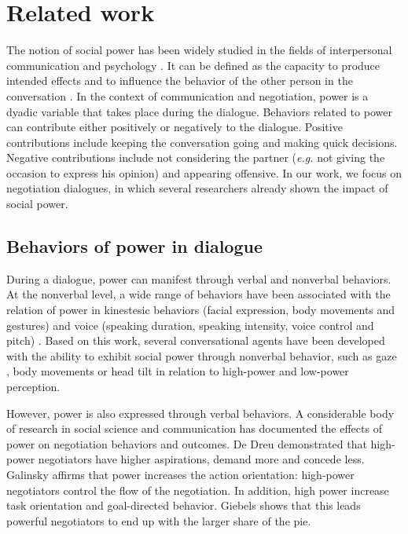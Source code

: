 \documentclass{llncs}
\begin{document}
		\section{Related work}
		The notion of social power has been widely studied in the fields of interpersonal communication and psychology \cite{kecskes2013research}. It can be defined as the capacity to produce intended effects and to influence the behavior of the other person in the conversation \cite{dunbar2005perceptions}. In the context of communication and negotiation, power is a dyadic variable that takes place during the dialogue.
		Behaviors related to power can contribute either positively or negatively to the dialogue. Positive contributions include keeping the conversation going and making quick decisions. Negative contributions include not considering the partner (\emph{e.g.} not giving the occasion to express his opinion) and appearing offensive. In our work, we focus on negotiation dialogues, in which several researchers already shown the impact of social power\cite{de2004influence,burgoonnonverbal}.

		\subsection{Behaviors of power in dialogue}
		\label{sec:domDialogue}
		During a dialogue, power can manifest through verbal and nonverbal behaviors.	
		At the nonverbal level, a wide range of behaviors have been associated with the relation of power in kinestesic behaviors (facial expression, body movements and gestures) and voice (speaking duration, speaking intensity, voice control and pitch) \cite{burgoonnonverbal}. Based on this work, several conversational agents have been developed with the ability to exhibit social power through nonverbal behavior, such as gaze \cite{lance2008relation}, body movements \cite{mignault2003many} or head tilt \cite{gebhard2014exploring}
		in relation to high-power and low-power perception.
		
		However, power is also expressed through verbal behaviors. A considerable body of research in social science and communication has documented the effects of power on negotiation behaviors and outcomes. De Dreu \cite{de1995impact} demonstrated that high-power negotiators have higher aspirations, demand more and concede less. Galinsky \cite{galinsky2003power} affirms that power increases the action orientation: high-power negotiators control the flow of the negotiation. In addition, high power increase task orientation and goal-directed behavior. Giebels \cite{giebels2000interdependence} shows that this leads powerful negotiators to end up with the larger share of the pie.
		
\end{document}
